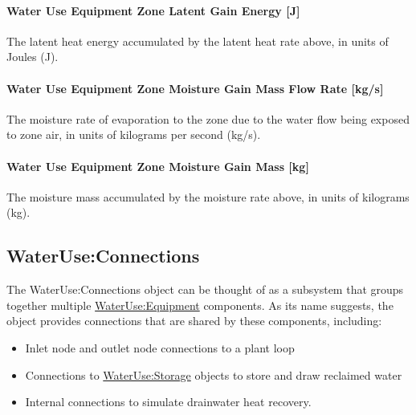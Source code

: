 \paragraph{Water Use Equipment Zone Latent Gain Energy {[}J{]}}\label{water-use-equipment-zone-latent-gain-energy-j}

The latent heat energy accumulated by the latent heat rate above, in units of Joules (J).

\paragraph{Water Use Equipment Zone Moisture Gain Mass Flow Rate {[}kg/s{]}}\label{water-use-equipment-zone-moisture-gain-mass-flow-rate-kgs}

The moisture rate of evaporation to the zone due to the water flow being exposed to zone air, in units of kilograms per second (kg/s).

\paragraph{Water Use Equipment Zone Moisture Gain Mass {[}kg{]}}\label{water-use-equipment-zone-moisture-gain-mass-kg}

The moisture mass accumulated by the moisture rate above, in units of kilograms (kg).

\subsection{WaterUse:Connections}\label{wateruseconnections}

The WaterUse:Connections object can be thought of as a subsystem that groups together multiple \hyperref[wateruseequipment]{WaterUse:Equipment} components. As its name suggests, the object provides connections that are shared by these components, including:

\begin{itemize}
\item
  Inlet node and outlet node connections to a plant loop
\item
  Connections to \hyperref[waterusestorage]{WaterUse:Storage} objects to store and draw reclaimed water
\item
  Internal connections to simulate drainwater heat recovery.
\end{itemize}

